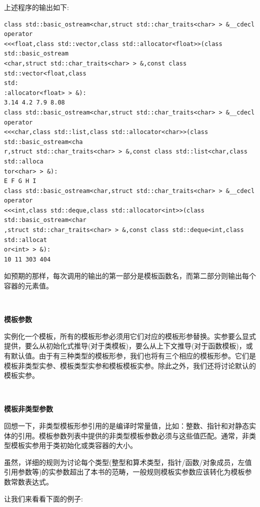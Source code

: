 上述程序的输出如下:

\begin{lstlisting}[caption={}]
class std::basic_ostream<char,struct std::char_traits<char> > &__cdecl
operator
<<<float,class std::vector,class std::allocator<float>>(class
std::basic_ostream
<char,struct std::char_traits<char> > &,const class std::vector<float,class
std:
:allocator<float> > &):
3.14 4.2 7.9 8.08
class std::basic_ostream<char,struct std::char_traits<char> > &__cdecl
operator
<<<char,class std::list,class std::allocator<char>>(class
std::basic_ostream<cha
r,struct std::char_traits<char> > &,const class std::list<char,class
std::alloca
tor<char> > &):
E F G H I
class std::basic_ostream<char,struct std::char_traits<char> > &__cdecl
operator
<<<int,class std::deque,class std::allocator<int>>(class
std::basic_ostream<char
,struct std::char_traits<char> > &,const class std::deque<int,class
std::allocat
or<int> > &):
10 11 303 404	
\end{lstlisting}

如预期的那样，每次调用的输出的第一部分是模板函数名，而第二部分则输出每个容器的元素值。 \par

\noindent\textbf{}\ \par
\textbf{模板参数} \ \par
实例化一个模板，所有的模板形参必须用它们对应的模板形参替换。实参要么显式提供，要么从初始化式推导(对于类模板)，要么从上下文推导(对于函数模板)，或有默认值。由于有三种类型的模板形参，我们也将有三个相应的模板形参。它们是模板非类型实参、模板类型实参和模板模板实参。除此之外，我们还将讨论默认的模板实参。 \par

\noindent\textbf{}\ \par
\textbf{模板非类型参数} \ \par
回想一下，非类型模板形参引用的是编译时常量值，比如：整数、指针和对静态实体的引用。模板参数列表中提供的非类型模板参数必须与这些值匹配。通常，非类型模板实参用于类初始化或类容器的大小。 \par
虽然，详细的规则为讨论每个类型(整型和算术类型，指针/函数/对象成员，左值引用参数等)的实参数超出了本书的范畴，一般规则模板实参数应该转化为模板参数常数表达式。 \par
让我们来看看下面的例子: \par

